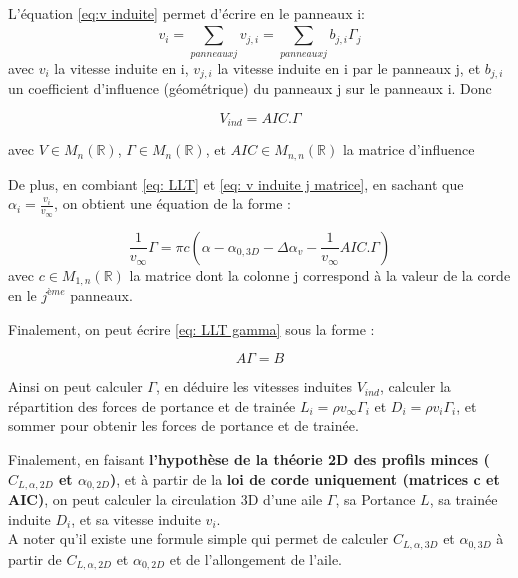 L'équation \ref{eq:v induite} permet d'écrire en le panneaux i:
\begin{equation}
    v_i = \sum_{panneaux j}^{} v_{j,i} = \sum_{panneaux j}^{} b_{j,i} \Gamma_j
    \label{eq: v induite j}
\end{equation}
avec $v_i$ la vitesse induite en i, $v_{j,i}$ la vitesse induite en i par le panneaux j, et $b_{j,i}$ un coefficient d'influence (géométrique) du panneaux j sur le panneaux i. Donc 

\begin{equation}
    V_{ind} = AIC .\Gamma
    \label{eq: v induite j matrice}
\end{equation}

avec $V \in M_n(\mathbb{R})$, $\Gamma \in M_n(\mathbb{R})$, et $AIC \in M_{n,n}(\mathbb{R})$ la matrice d'influence

De plus, en combiant \ref{eq: LLT} et \ref{eq: v induite j matrice}, en sachant que $\alpha_i = \frac{v_i}{v_{\infty}}$, on obtient une équation de la forme : 

\begin{equation}
    \frac{1}{v_{\infty}}\Gamma = \pi c (\alpha-\alpha_{0,3D} - \Delta\alpha_v - \frac{1}{v_{\infty}} AIC.\Gamma)
    \label{eq: LLT gamma}
\end{equation}
avec $c \in M_{1,n}(\mathbb{R})$ la matrice dont la colonne j correspond à la valeur de la corde en le $j^{ème}$ panneaux.

Finalement, on peut écrire \ref{eq: LLT gamma} sous la forme :

\begin{equation}
    A \Gamma = B
    \label{eq: LLT gamma 2 }
\end{equation}

Ainsi on peut calculer $\Gamma$, en déduire les vitesses induites $V_{ind}$, calculer la répartition des forces de portance et de trainée $L_i = \rho v_{\infty} \Gamma_i$ et $D_i = \rho v_i \Gamma_i$, et sommer pour obtenir les forces de portance et de trainée.

Finalement, en faisant \textbf{l’hypothèse de la théorie 2D des profils minces ($C_{L, \alpha, 2D}$ et $\alpha_{0, 2D}$)}, et à partir de la \textbf{loi de corde uniquement (matrices c et AIC)}, on peut calculer la circulation 3D d’une aile $\Gamma$, sa Portance $L$, sa trainée induite $D_i$, et sa vitesse induite $v_i$. \\
A noter qu'il existe une formule simple qui permet de calculer $C_{L, \alpha, 3D}$ et $\alpha_{0, 3D}$ à partir de $C_{L, \alpha, 2D}$ et $\alpha_{0, 2D}$ et de l'allongement de l'aile.

